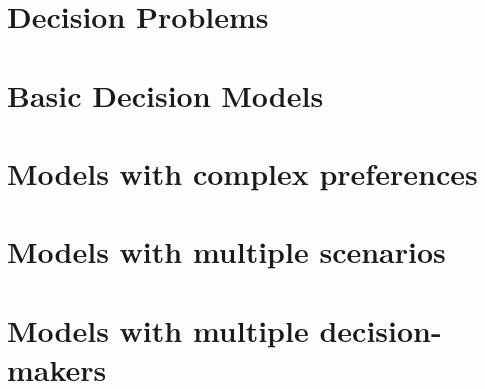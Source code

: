 \documentclass[11pt]{report}
\begin{document}
	\maketitle
	\tableofcontents
	\newpage	
	
	\part{Decision Problems}
	
	
	
	
	
	\part{Basic Decision Models}
	
	
	
	
	\part{Models with complex preferences}
	
	
	
	
	\part{Models with multiple scenarios}
	
	
	
	
	
	
	\part{Models with multiple decision-makers}
	
	
	
	
	
	
\end{document}
